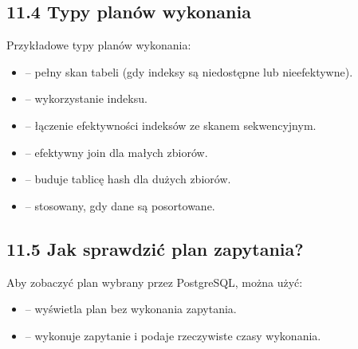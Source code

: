 \documentclass[a4paper,11pt,polish]{sphinxmanual}
\begin{document}
\subsection{11.4 Typy planów wykonania}
\label{\detokenize{Konfiguracja_baz_danych/Konfiguracja_baz_danych:typy-planow-wykonania}}
\sphinxAtStartPar
Przykładowe typy planów wykonania:
\begin{itemize}
\item {} 
\sphinxAtStartPar
{} – pełny skan tabeli (gdy indeksy są niedostępne lub nieefektywne).

\item {} 
\sphinxAtStartPar
{} – wykorzystanie indeksu.

\item {} 
\sphinxAtStartPar
{} – łączenie efektywności indeksów ze skanem sekwencyjnym.

\item {} 
\sphinxAtStartPar
{} – efektywny join dla małych zbiorów.

\item {} 
\sphinxAtStartPar
{} – buduje tablicę hash dla dużych zbiorów.

\item {} 
\sphinxAtStartPar
{} – stosowany, gdy dane są posortowane.

\end{itemize}


\subsection{11.5 Jak sprawdzić plan zapytania?}
\label{\detokenize{Konfiguracja_baz_danych/Konfiguracja_baz_danych:jak-sprawdzic-plan-zapytania}}
\sphinxAtStartPar
Aby zobaczyć plan wybrany przez PostgreSQL, można użyć:

\begin{sphinxVerbatim}[commandchars=\\\{\}]
         
\end{sphinxVerbatim}
\begin{itemize}
\item {} 
\sphinxAtStartPar
{} – wyświetla plan bez wykonania zapytania.

\item {} 
\sphinxAtStartPar
{} – wykonuje zapytanie i podaje rzeczywiste czasy wykonania.

\end{itemize}
\end{document}
